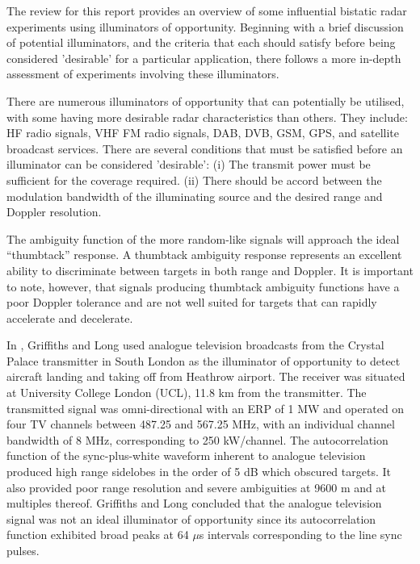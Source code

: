 The review for this report provides an overview of some influential bistatic radar experiments using illuminators of opportunity.  Beginning with a brief discussion of potential illuminators, and the criteria that each should satisfy before being considered 'desirable' for a particular application, there follows a more in-depth assessment of experiments involving these illuminators.  

There are numerous illuminators of opportunity that can potentially be utilised, with some having more desirable radar characteristics than others.  They include: HF radio signals, VHF FM radio signals, DAB, DVB, GSM, GPS, and satellite broadcast services.  There are several conditions that must be satisfied before an illuminator can be considered 'desirable': (i) The transmit power must be sufficient for the coverage required.  (ii) There should be accord between the modulation bandwidth of the illuminating source and the desired range and Doppler resolution. 

The ambiguity function of the more random-like signals will approach the ideal ``thumbtack'' response. A thumbtack ambiguity response represents an excellent ability to discriminate between targets in both range and Doppler. It is important to note, however, that signals producing thumbtack ambiguity functions have a poor Doppler tolerance and are not well suited for targets that can rapidly accelerate and decelerate.  

In \cite{griffiths1986}, Griffiths and Long used analogue television broadcasts from the Crystal Palace transmitter in South London as the illuminator of opportunity to detect aircraft landing and taking off from Heathrow airport.  The receiver was situated at University College London (UCL), 11.8 km from the transmitter.  The transmitted signal was omni-directional with an ERP of 1 MW and operated on four TV channels between 487.25 and 567.25 MHz, with an individual channel bandwidth of 8 MHz, corresponding to 250 kW/channel. The autocorrelation function of the sync-plus-white waveform inherent to analogue television produced high range sidelobes in the order of 5 dB which obscured targets.  It also provided poor range resolution and severe ambiguities at 9600 m and at multiples thereof.  Griffiths and Long concluded that the analogue television signal was not an ideal illuminator of opportunity since its autocorrelation function exhibited broad peaks at 64 $\mu$s intervals corresponding to the line sync pulses.  

